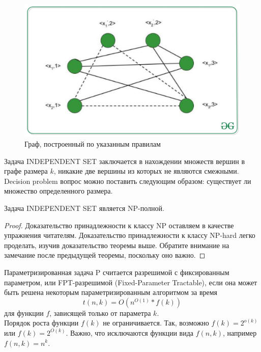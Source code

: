             \begin{figure}
        \includegraphics[width=1\linewidth]{images/cliqueproblem.jpeg}
        \caption{Граф, построенный по указанным правилам}
        \label{ris:cliqueproblem}
        \end{figure}
    \begin{Def}
        Задача INDEPENDENT SET заключается в нахождении множеств  вершин в графе размера $k$, никакие две вершины из которых не являются смежными. Decision problem вопрос можно поставить следующим образом: существует ли множество определенного размера.
    \end{Def}
    \begin{Thm}
        Задача INDEPENDENT SET является NP-полной. 
    \end{Thm}
    \begin{proof}
        Доказательство принадлежности к классу NP оставляем в качестве упражнения читателям. Доказательство принадлежности к классу NP-hard легко проделать, изучив доказательство теоремы выше. Обратите внимание на замечание после предыдущей теоремы, поскольку оно важно.
    \end{proof}
    \begin{Def}
        Параметризированная задача P считается разрешимой с фиксированным параметром, или FPT-разрешимой (Fixed-Parameter Tractable), если она может быть решена некоторым параметризированным алгоритмом за время
        $$t(n, k) = O(n^{O(1)} * f(k))$$
        для функции $f$, зависящей только от параметра $k$.\\ 
        Порядок роста функции $f(k)$ не ограничивается. Так, возможно $f(k) = 2^{o(k)}$ или $f(k) = 2^{O(k)}$. Важно, что исключаются функции вида $f(n, k)$, например $f(n, k) = n^k$.
    \end{Def}
